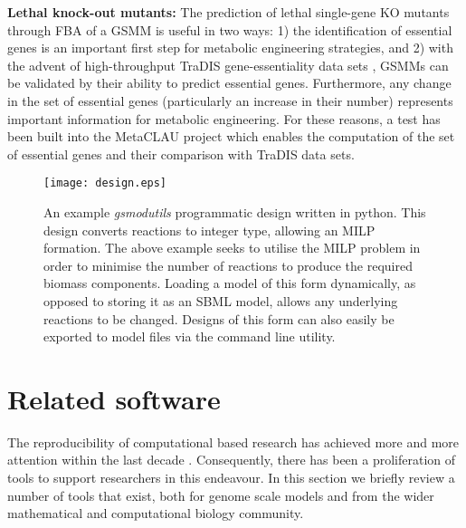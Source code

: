 \documentclass[journal=asbcd6]{achemso}
\begin{document}
\textbf{Lethal knock-out mutants:} 
The prediction of lethal single-gene KO mutants through FBA of a GSMM is useful in two ways: 
1) the identification of essential genes is an important first step for metabolic engineering strategies, 
and 2) with the advent of high-throughput TraDIS gene-essentiality data sets \cite{langridge2009simultaneous}, GSMMs can be validated by their ability to predict essential genes.
Furthermore, any change in the set of essential genes (particularly an increase in their number) represents important information for metabolic engineering.
For these reasons, a test has been built into the MetaCLAU project which enables the computation of the set of essential genes and their comparison with TraDIS data sets.

\begin{figure}[ht]
\texttt{[image: design.eps]}
\caption{An example \textit{gsmodutils} programmatic design written in python. 
This design converts reactions to integer type, allowing an MILP formation.
The above example seeks to utilise the MILP problem in order to minimise the number of reactions to produce the required biomass components.
Loading a model of this form dynamically, as opposed to storing it as an SBML model, allows any underlying reactions to be changed.
Designs of this form can also easily be exported to model files via the command line utility.
}
\label{fig:programmatic_design} 
\end{figure}

\vspace*{-12pt}
\section{Related software}

The reproducibility of computational based research has achieved more and more attention within the last decade \cite{peng2011reproducible, sandve2013ten, cooper2015call}.
Consequently, there has been a proliferation of tools to support researchers in this endeavour.
In this section we briefly review a number of tools that exist, both for genome scale models and from the wider mathematical and computational biology community.
\end{document}
